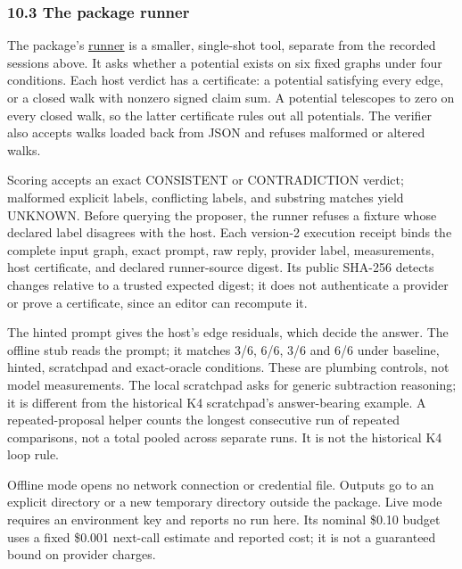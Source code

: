 \documentclass[
  11pt,
]{article}
\begin{document}
\hypertarget{the-package-runner}{%
\subsubsection{10.3 The package runner}\label{the-package-runner}}

The package's
\href{https://github.com/dbccpage/the_symbol_game/blob/main/omega_engine_education/documentation/030_pfp_proposal_fidelity_protocol_pfp/papers/omega_engine_symbol_game/008_pfp_mssn_tower_challenges_and_retraction_benchmarks/code/retraction_benchmark_runner.py}{runner}
is a smaller, single-shot tool, separate from the recorded sessions
above. It asks whether a potential exists on six fixed graphs under four
conditions. Each host verdict has a certificate: a potential satisfying
every edge, or a closed walk with nonzero signed claim sum. A potential
telescopes to zero on every closed walk, so the latter certificate rules
out all potentials. The verifier also accepts walks loaded back from
JSON and refuses malformed or altered walks.

Scoring accepts an exact CONSISTENT or CONTRADICTION verdict; malformed
explicit labels, conflicting labels, and substring matches yield
UNKNOWN. Before querying the proposer, the runner refuses a fixture
whose declared label disagrees with the host. Each version-2 execution
receipt binds the complete input graph, exact prompt, raw reply,
provider label, measurements, host certificate, and declared
runner-source digest. Its public SHA-256 detects changes relative to a
trusted expected digest; it does not authenticate a provider or prove a
certificate, since an editor can recompute it.

The hinted prompt gives the host's edge residuals, which decide the
answer. The offline stub reads the prompt; it matches 3/6, 6/6, 3/6 and
6/6 under baseline, hinted, scratchpad and exact-oracle conditions.
These are plumbing controls, not model measurements. The local
scratchpad asks for generic subtraction reasoning; it is different from
the historical K4 scratchpad's answer-bearing example. A
repeated-proposal helper counts the longest consecutive run of repeated
comparisons, not a total pooled across separate runs. It is not the
historical K4 loop rule.

Offline mode opens no network connection or credential file. Outputs go
to an explicit directory or a new temporary directory outside the
package. Live mode requires an environment key and reports no run here.
Its nominal \$0.10 budget uses a fixed \$0.001 next-call estimate and
reported cost; it is not a guaranteed bound on provider charges.
\end{document}
